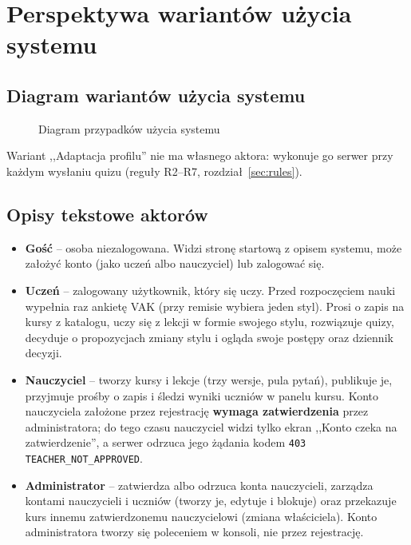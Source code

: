 \section{Perspektywa wariantów użycia systemu}

\subsection{Diagram wariantów użycia systemu}

\begin{figure}[H]
    \centering
    
    \caption{Diagram przypadków użycia systemu}
\end{figure}

Wariant ,,Adaptacja profilu'' nie ma własnego aktora: wykonuje go serwer przy każdym wysłaniu quizu (reguły R2--R7, rozdział~\ref{sec:rules}).

\subsection{Opisy tekstowe aktorów}

\begin{itemize}[leftmargin=*]
    \item \textbf{Gość} -- osoba niezalogowana. Widzi stronę startową z opisem systemu, może założyć konto (jako uczeń albo nauczyciel) lub zalogować się.

    \item \textbf{Uczeń} -- zalogowany użytkownik, który się uczy. Przed rozpoczęciem nauki wypełnia raz ankietę VAK (przy remisie wybiera jeden styl). Prosi o zapis na kursy z katalogu, uczy się z lekcji w formie swojego stylu, rozwiązuje quizy, decyduje o propozycjach zmiany stylu i ogląda swoje postępy oraz dziennik decyzji.

    \item \textbf{Nauczyciel} -- tworzy kursy i lekcje (trzy wersje, pula pytań), publikuje je, przyjmuje prośby o zapis i śledzi wyniki uczniów w panelu kursu. Konto nauczyciela założone przez rejestrację \textbf{wymaga zatwierdzenia} przez administratora; do tego czasu nauczyciel widzi tylko ekran ,,Konto czeka na zatwierdzenie'', a serwer odrzuca jego żądania kodem \texttt{403 TEACHER\_NOT\_APPROVED}.

    \item \textbf{Administrator} -- zatwierdza albo odrzuca konta nauczycieli, zarządza kontami nauczycieli i uczniów (tworzy je, edytuje i blokuje) oraz przekazuje kurs innemu zatwierdzonemu nauczycielowi (zmiana właściciela). Konto administratora tworzy się poleceniem w konsoli, nie przez rejestrację.
\end{itemize}

